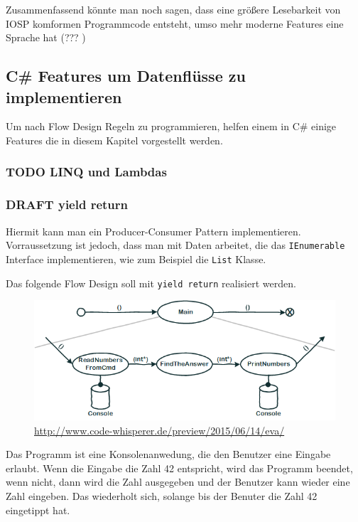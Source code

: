 \documentclass[11pt]{article}
\begin{document}
Zusammenfassend könnte man noch sagen, dass eine größere Lesebarkeit von IOSP komformen Programmcode entsteht, umso mehr moderne
Features eine Sprache hat (??? )
\subsection{C\# Features um Datenflüsse zu implementieren}
\label{sec:orgheadline30}
Um nach Flow Design Regeln zu programmieren, helfen einem in C\# einige Features die in diesem Kapitel vorgestellt werden.

\subsubsection{{\bfseries\sffamily TODO} LINQ und Lambdas}
\label{sec:orgheadline26}
\subsubsection{{\bfseries\sffamily DRAFT} yield return}
\label{sec:orgheadline29}
Hiermit kann man ein Producer-Consumer Pattern implementieren.
Vorraussetzung ist jedoch, dass man mit Daten arbeitet, die das \texttt{IEnumerable} Interface implementieren, wie zum Beispiel die
\texttt{List} Klasse.

Das folgende Flow Design soll mit \texttt{yield return} realisiert werden.

\begin{figure}[htb]
\centering
\includegraphics[width=.9\linewidth]{./img/FlowDesign2.png}
\caption{\url{http://www.code-whisperer.de/preview/2015/06/14/eva/}}
\end{figure}


Das Programm ist eine Konsolenanwedung, die den Benutzer eine Eingabe erlaubt.
Wenn die Eingabe die Zahl 42 entspricht, wird das Programm beendet, wenn nicht,
dann wird die Zahl ausgegeben und der Benutzer kann wieder eine Zahl eingeben.
Das wiederholt sich, solange bis der Benuter die Zahl 42 eingetippt hat.
\end{document}
